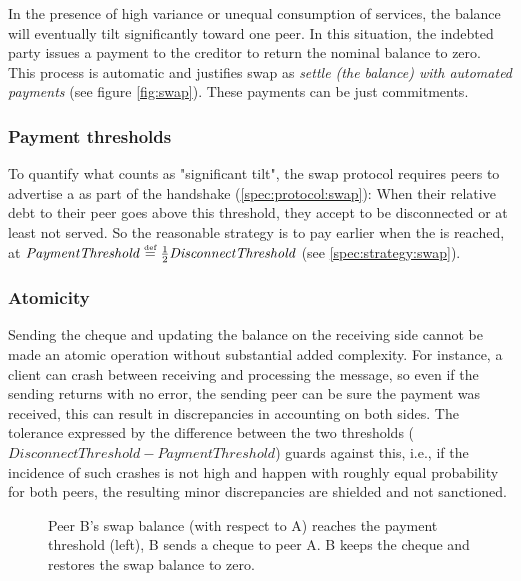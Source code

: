 In the presence of high variance or unequal consumption of services, the balance will eventually tilt significantly toward one peer. In this situation, the indebted party issues a payment to the creditor to return the nominal balance to zero. This process is automatic and justifies swap as \emph{settle (the balance) with automated payments} (see figure \ref{fig:swap}). These payments can be just commitments.


\subsubsection{Payment thresholds}

To quantify what counts as "significant tilt", the swap protocol requires peers to advertise a  as part of the handshake (\ref{spec:protocol:swap}): When their relative debt to their peer goes above this threshold, they accept to be disconnected or at least not served. So the reasonable strategy is to pay earlier when the  is reached, at $\mathit{Payment Threshold}\overset{\textrm{\tiny def}}{=}\frac{1}{2}\mathit{DisconnectThreshold}$ (see \ref{spec:strategy:swap}). 


\subsubsection{Atomicity}

Sending the cheque and updating the balance on the receiving side cannot be made an atomic operation without substantial added complexity. For instance, a client can  crash between receiving and processing the message, so even if the sending returns with no error, the sending peer can be sure the payment was received, this can result in discrepancies in accounting on both sides. The tolerance expressed by the difference between the two thresholds ($\mathit{DisconnectThreshold}-\mathit{Payment Threshold}$) guards against this, i.e., if the incidence of such crashes is not high and happen with roughly equal probability for both peers, the resulting minor discrepancies are shielded and not sanctioned.

\begin{center}
\begin{figure}[htbp]

\caption[Cheque swap]{Peer B's swap balance (with respect to A) reaches the payment threshold (left),
B sends a cheque to peer A. B keeps the cheque and restores the swap balance to zero.}
\label{fig:chequeswap}
\end{figure}
\end{center}

